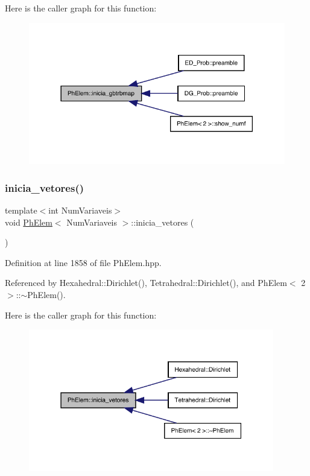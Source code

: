 Here is the caller graph for this function\+:
\nopagebreak
\begin{figure}[H]
\begin{center}
\leavevmode
\includegraphics[width=318pt]{classPhElem_a9b5610a7a12eddbc4a9f07429500a6da_icgraph}
\end{center}
\end{figure}
\mbox{\label{classPhElem_a04e36bca293dabc7a88fe2ad2d527dc4}} 
\subsubsection{\texorpdfstring{inicia\+\_\+vetores()}{inicia\_vetores()}}
{\footnotesize\ttfamily template$<$int Num\+Variaveis$>$ \\
void \hyperlink{classPhElem}{Ph\+Elem}$<$ Num\+Variaveis $>$\+::inicia\+\_\+vetores (\begin{DoxyParamCaption}{ }\end{DoxyParamCaption})}



Definition at line 1858 of file Ph\+Elem.\+hpp.



Referenced by Hexahedral\+::\+Dirichlet(), Tetrahedral\+::\+Dirichlet(), and Ph\+Elem$<$ 2 $>$\+::$\sim$\+Ph\+Elem().

Here is the caller graph for this function\+:
\nopagebreak
\begin{figure}[H]
\begin{center}
\leavevmode
\includegraphics[width=304pt]{classPhElem_a04e36bca293dabc7a88fe2ad2d527dc4_icgraph}
\end{center}
\end{figure}
\mbox{\label{classPhElem_a3064c3377eb3f81d63f43969a3c958ee}} 
